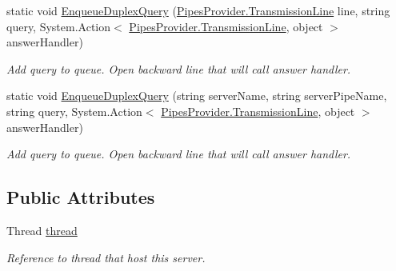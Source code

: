 \begin{DoxyCompactItemize}
\item 
static void \mbox{\hyperlink{class_uniform_client_1_1_base_client_a09f3a6de4a33cd5f3eaba564544440e1}{Enqueue\+Duplex\+Query}} (\mbox{\hyperlink{class_pipes_provider_1_1_transmission_line}{Pipes\+Provider.\+Transmission\+Line}} line, string query, System.\+Action$<$ \mbox{\hyperlink{class_pipes_provider_1_1_transmission_line}{Pipes\+Provider.\+Transmission\+Line}}, object $>$ answer\+Handler)
\begin{DoxyCompactList}\small\item\em Add query to queue. Open backward line that will call answer handler. \end{DoxyCompactList}\item 
static void \mbox{\hyperlink{class_uniform_client_1_1_base_client_a98d1abc1fea84d7222291c462c4f9416}{Enqueue\+Duplex\+Query}} (string server\+Name, string server\+Pipe\+Name, string query, System.\+Action$<$ \mbox{\hyperlink{class_pipes_provider_1_1_transmission_line}{Pipes\+Provider.\+Transmission\+Line}}, object $>$ answer\+Handler)
\begin{DoxyCompactList}\small\item\em Add query to queue. Open backward line that will call answer handler. \end{DoxyCompactList}\end{DoxyCompactItemize}
\subsection*{Public Attributes}
\begin{DoxyCompactItemize}
\item 
Thread \mbox{\hyperlink{class_uniform_client_1_1_base_client_a458271823ca5e21612c0947e1db695a0}{thread}}
\begin{DoxyCompactList}\small\item\em Reference to thread that host this server. \end{DoxyCompactList}\end{DoxyCompactItemize}
